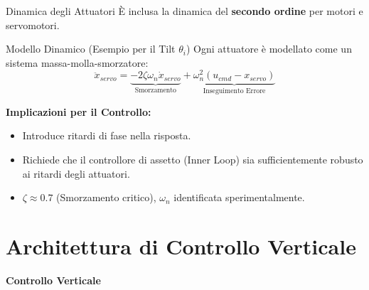 \documentclass[aspectratio=169]{beamer} %
\begin{document}
\begin{frame}{Dinamica degli Attuatori}
    È inclusa la dinamica del \textbf{secondo ordine} per motori e servomotori.
    
    \vspace{0.5cm}
    \begin{block}{Modello Dinamico (Esempio per il Tilt $\theta_i$)}
    Ogni attuatore è modellato come un sistema massa-molla-smorzatore:
    \begin{equation}
        \ddot{x}_{servo} = \underbrace{-2\zeta \omega_n \dot{x}_{servo}}_{\text{Smorzamento}} + \underbrace{\omega_n^2 (u_{cmd} - x_{servo})}_{\text{Inseguimento Errore}}
    \end{equation}
    \end{block}

    \vspace{0.5cm}
    \textbf{Implicazioni per il Controllo:}
    \begin{itemize}
        \item Introduce ritardi di fase nella risposta.
        \item Richiede che il controllore di assetto (Inner Loop) sia sufficientemente robusto ai ritardi degli attuatori.
        \item $\zeta \approx 0.7$ (Smorzamento critico), $\omega_n$ identificata sperimentalmente.
    \end{itemize}
\end{frame}


\section{Architettura di Controllo Verticale}

\begin{frame}
    \vfill
    \centering
    {\Huge \textbf{Controllo Verticale}}
    \vfill
\end{frame}
\end{document}
